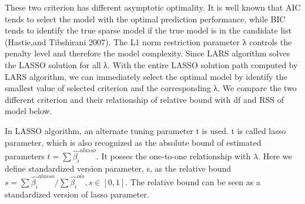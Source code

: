 \documentclass[titlepage,11pt]{article}
\begin{document}
These two criterion has different asymptotic optimality. It is well known that AIC tends to select the model with the optimal prediction performance, while BIC tends to identify the true sparse model if the true model is in the candidate list (Hastie,and Tibshirani  2007). The L1 norm restriction parameter λ controls the penalty level and therefore the model complexity. Since LARS algorithm solves the LASSO solution for all λ. With the entire LASSO solution path computed by LARS algorithm, we can immediately select the optimal model by identify the smallest value of selected criterion and the corresponding λ. We compare the two different criterion and their relationship of relative bound with df and RSS of model below. 

In LASSO algorithm, an alternate tuning parameter t is used. t is called lasso parameter, which is also recognized as the absolute bound of estimated parameters $t =\sum \hat{\beta_i}^{alasso}$. It posses the one-to-one relationship with $\lambda$.  Here we define standardized version parameter, s, as the relative bound $s =\sum\hat{\beta_i}^{alasso}/\sum \hat{\beta_i}^{ols}, s\in [0,1]$. The relative bound can be seen as a standardized version of lasso parameter. 
\end{document}
